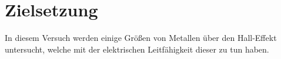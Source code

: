 \section{Zielsetzung}
\label{sec:Zielsetzung}


In diesem Versuch werden einige Größen von Metallen über den Hall-Effekt untersucht, welche mit der elektrischen Leitfähigkeit dieser zu tun haben.